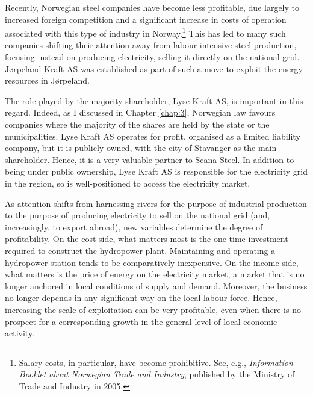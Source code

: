 Recently, Norwegian steel companies have become less profitable, due largely to increased foreign competition and a significant increase in costs of operation associated with this type of industry in Norway.\footnote{Salary costs, in particular, have become prohibitive. See, e.g., \emph{Information Booklet about Norwegian Trade and Industry}, published by the Ministry of Trade and Industry in 2005.} This has led to many such companies shifting their attention away from labour-intensive steel production, focusing instead on producing electricity, selling it directly on the national grid. Jørpeland Kraft AS was established as part of such a move to exploit the energy resources in Jørpeland.

The role played by the majority shareholder, Lyse Kraft AS, is important in this regard. Indeed, as I discussed in Chapter \ref{chap:3}, Norwegian law favours companies where the majority of the shares are held by the state or the municipalities. Lyse Kraft AS operates for profit, organised as a limited liability company, but it is publicly owned, with the city of Stavanger as the main shareholder. Hence, it is a very valuable partner to Scana Steel. In addition to being under public ownership, Lyse Kraft AS is responsible for the electricity grid in the region, so is well-positioned to access the electricity market.


As attention shifts from harnessing rivers for the purpose of industrial production to the purpose of producing electricity to sell on the national grid (and, increasingly, to export abroad), new variables determine the degree of profitability. On the cost side, what matters most is the one-time investment required to construct the hydropower plant. Maintaining and operating a hydropower station tends to be comparatively inexpensive. On the income side, what matters is the price of energy on the electricity market, a market that is no longer anchored in local conditions of supply and demand. Moreover, the business no longer depends in any significant way on the local labour force. Hence, increasing the scale of exploitation can be very profitable, even when there is no prospect for a corresponding growth in the general level of local economic activity. 

